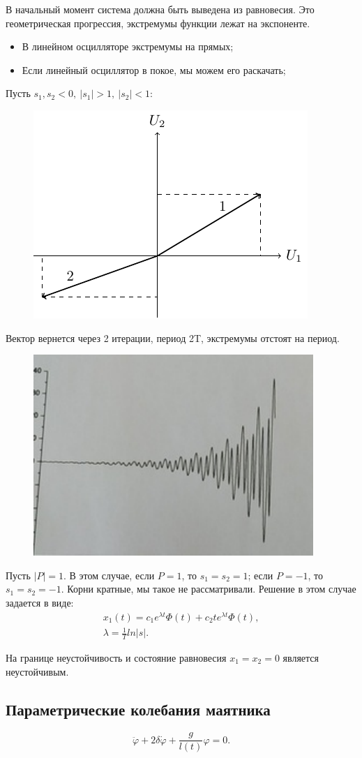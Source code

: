 В начальный момент система должна быть выведена из равновесия. Это геометрическая прогрессия, экстремумы функции лежат на экспоненте. 
\begin{itemize}
	\item В линейном осцилляторе экстремумы на прямых;
	\item Если линейный осциллятор в покое, мы можем его раскачать;
\end{itemize}

Пусть $s_1,s_2<0,~|s_1|>1,~|s_2|<1$:
\begin{figure}[H]
	\centering
	\includegraphics[width=0.5\linewidth]{fig/fig43.pdf}   
\end{figure}

Вектор вернется через 2 итерации, период 2T, экстремумы отстоят на период.
\begin{figure}[H]
	\centering
	\includegraphics[width=0.4\linewidth]{fig/fig44.pdf}   
\end{figure}

Пусть $|P|=1$. В этом случае, если $P=1$, то $s_1=s_2=1$; если $P=-1$, то $s_1=s_2=-1$. Корни кратные, мы такое не рассматривали. Решение в этом случае задается в виде:
\begin{gather*}
	x_1(t)=c_1 e^{\lambda t}\Phi(t)+c_2te^{\lambda t}\Phi(t), \\
	\lambda=\frac{1}{T}ln|s|.
\end{gather*}

На границе неустойчивость и состояние равновесия $x_1=x_2=0$ является неустойчивым.

\subsection{Параметрические колебания маятника}
\begin{equation}
	\ddot{\varphi}+2\delta \dot{\varphi}+\frac{g}{l(t)}\varphi=0.
	\label{eq:81}
\end{equation}


